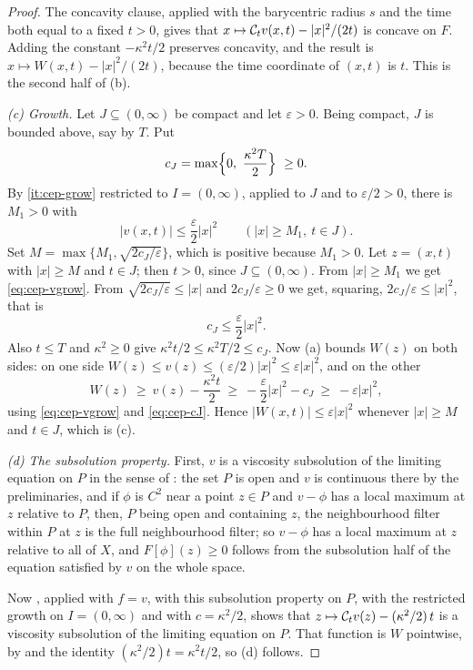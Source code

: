 \begin{proof}
The concavity clause, applied with the barycentric radius $s$ and the time
both equal to a fixed $t>0$, gives that $x\mapsto\mathcal{C}_tv(x,t)-|x|^2/(2t)$ is
concave on $F$. Adding the constant $-\kappa^2t/2$ preserves concavity, and the
result is $x\mapsto W(x,t)-|x|^2/(2t)$, because the time coordinate of $(x,t)$
is $t$. This is the second half of (b).

\emph{(c) Growth.} Let $J\subseteq(0,\infty)$ be compact and let
$\varepsilon>0$. Being compact, $J$ is bounded above, say by $T$. Put
\[
  c_J=\max\Bigl\{0,\ \frac{\kappa^2T}{2}\Bigr\}\ \ge 0 .
\]
By \ref{it:cep-grow} restricted to $I=(0,\infty)$, applied to $J$ and to
$\varepsilon/2>0$, there is $M_1>0$ with
\begin{equation}\label{eq:cep-vgrow}
  |v(x,t)|\le\frac{\varepsilon}{2}|x|^2\qquad(|x|\ge M_1,\ t\in J).
\end{equation}
Set $M=\max\{M_1,\sqrt{2c_J/\varepsilon}\}$, which is positive because
$M_1>0$. Let $z=(x,t)$ with $|x|\ge M$ and $t\in J$; then $t>0$, since
$J\subseteq(0,\infty)$. From $|x|\ge M_1$ we get \eqref{eq:cep-vgrow}. From
$\sqrt{2c_J/\varepsilon}\le|x|$ and $2c_J/\varepsilon\ge0$ we get, squaring,
$2c_J/\varepsilon\le|x|^2$, that is
\begin{equation}\label{eq:cep-cJ}
  c_J\le\frac{\varepsilon}{2}|x|^2 .
\end{equation}
Also $t\le T$ and $\kappa^2\ge0$ give $\kappa^2t/2\le\kappa^2T/2\le c_J$. Now
(a) bounds $W(z)$ on both sides: on one side
$W(z)\le v(z)\le(\varepsilon/2)|x|^2\le\varepsilon|x|^2$, and on the other
\[
  W(z)\ \ge\ v(z)-\frac{\kappa^2t}{2}
    \ \ge\ -\frac{\varepsilon}{2}|x|^2-c_J
    \ \ge\ -\varepsilon|x|^2 ,
\]
using \eqref{eq:cep-vgrow} and \eqref{eq:cep-cJ}. Hence
$|W(x,t)|\le\varepsilon|x|^2$ whenever $|x|\ge M$ and $t\in J$, which is (c).

\emph{(d) The subsolution property.} First, $v$ is a viscosity subsolution of
the limiting equation on $P$ in the sense of : the set
$P$ is open and $v$ is continuous there by the preliminaries, and if $\phi$ is
$C^2$ near a point $z\in P$ and $v-\phi$ has a local maximum at $z$ relative to
$P$, then, $P$ being open and containing $z$, the neighbourhood filter within
$P$ at $z$ is the full neighbourhood filter; so $v-\phi$ has a local maximum at
$z$ relative to all of $X$, and $F[\phi](z)\ge0$ follows from the subsolution
half of the equation satisfied by $v$ on the whole space.

Now , applied with $f=v$, with this subsolution
property on $P$, with the restricted growth on $I=(0,\infty)$ and with
$c=\kappa^2/2$, shows that $z\mapsto\mathcal{C}_tv(z)-(\kappa^2/2)\,t$ is a viscosity
subsolution of the limiting equation on $P$. That function is $W$ pointwise, by
 and the identity $(\kappa^2/2)t=\kappa^2t/2$, so (d)
follows.


\end{proof}
